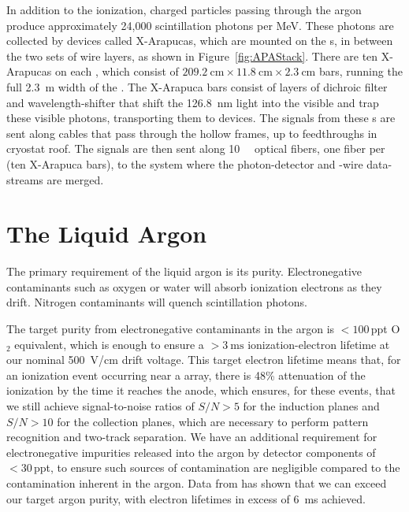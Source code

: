 In addition to the ionization, charged particles passing through the argon produce approximately 24,000 scintillation photons per \si{\mega\electronvolt}. These photons are collected by devices called X-Arapucas, which are mounted on the s, in between the two sets of wire layers, as shown in Figure~\ref{fig:APAStack}. There are ten X-Arapucas on each , which consist of $\SI{209.2}{\cm}\times\SI{11.8}{\cm}\times\SI{2.3}{\cm}$ bars, running the full \SI{2.3}{\meter} width of the . The X-Arapuca bars consist of layers of dichroic filter and wavelength-shifter that shift the \SI{126.8}{\nano\meter} light into the visible and trap these visible photons, transporting them to  devices. The signals from these s are sent along cables that pass through the hollow  frames, up to feedthroughs in cryostat roof. The signals are then sent along \SI{10}{\giga\byte} optical fibers, one fiber per  (ten X-Arapuca bars), to the  system where the photon-detector and -wire data-streams are merged.

\section{The Liquid Argon}
\label{sec:fdsp-exec-liquidargon}

The primary requirement of the liquid argon is its purity. Electronegative contaminants such as oxygen or water will absorb ionization electrons as they drift. Nitrogen contaminants will quench scintillation photons.

The target purity from electronegative contaminants in the argon is $<\!100$\,ppt O$_{2}$ equivalent, which is enough to ensure a $>\!\SI{3}{\milli\second}$ ionization-electron lifetime at our nominal \SI{500}{\volt/\centi\meter} drift voltage. This target electron lifetime means that, for an ionization event occurring near a  array, there is 48\% attenuation of the ionization by the time it reaches the anode, which ensures, for these events, that we still achieve signal-to-noise ratios of $S/N>5$ for the induction planes and $S/N>10$ for the collection planes, which are necessary to perform pattern recognition and two-track separation. We have an additional requirement for electronegative impurities released into the argon by detector components of $<\!30$\,ppt, to ensure such sources of contamination are negligible compared to the contamination inherent in the argon. Data from  has shown that we can exceed our target argon purity, with electron lifetimes in excess of \SI{6}{\milli\second} achieved.

